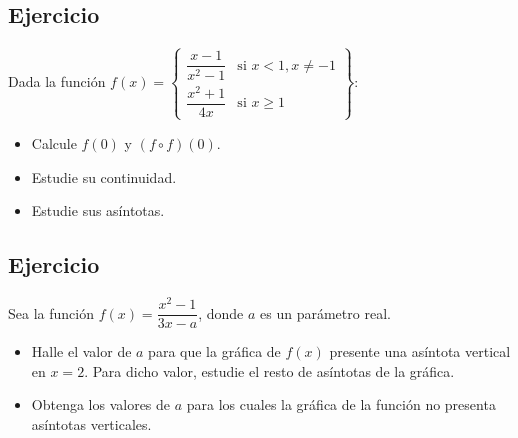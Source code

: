 \documentclass[10pt, a4paper]{article}
\begin{document}
\subsection{Ejercicio}
\label{sec:org3d97ca7}
Dada la función \(f(x) = \left\{ \begin{array}{ll} \dfrac{x-1}{x^{2} - 1} & \text{si } x < 1, x \neq -1 \\ \dfrac{x^{2} + 1}{4x} & \text{si } x \geq 1 \end{array}  \right\}\):
\begin{itemize}
\item Calcule \(f(0)\) y \((f \circ f)(0)\).
\item Estudie su continuidad.
\item Estudie sus asíntotas.
\end{itemize}
\subsection{Ejercicio}
\label{sec:org5782e38}
Sea la función \(f(x) = \dfrac{x^{2} - 1}{3x - a}\), donde \(a\) es un parámetro real.
\begin{itemize}
\item Halle el valor de \(a\) para que la gráfica de \(f(x)\) presente una asíntota vertical en \(x=2\). Para dicho valor, estudie el resto de asíntotas de la gráfica.
\item Obtenga los valores de \(a\) para los cuales la gráfica de la función no presenta asíntotas verticales.
\end{itemize}
\end{document}
